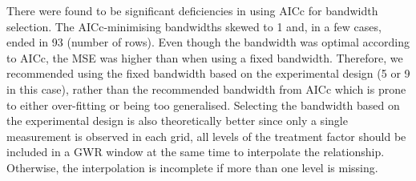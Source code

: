 \documentclass[a4paper]{article} 	%
\begin{document}

There were found to be significant deficiencies in using AICc for bandwidth selection. The AICc-minimising bandwidths skewed to 1 and, in a few cases, ended in 93 (number of rows). Even though the bandwidth was optimal according to AICc, the MSE was higher than when using a fixed bandwidth. Therefore, we recommended using the fixed bandwidth based on the experimental design (5 or 9 in this case), rather than the recommended bandwidth from AICc which is prone to either over-fitting or being too generalised. Selecting the bandwidth based on the experimental design is also theoretically better since only a single measurement is observed in each grid, all levels of the treatment factor should be included in a GWR window at the same time to interpolate the %
relationship. Otherwise, the interpolation is incomplete if more than one level is missing. 


\end{document}
